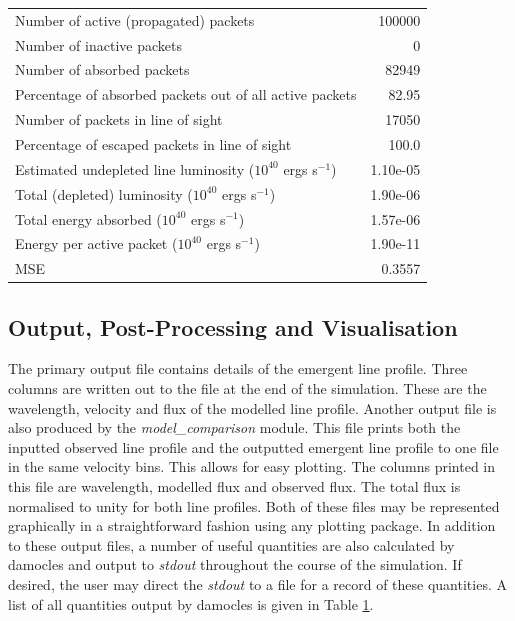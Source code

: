 \begin{table}
\begin{center}
\begin{tabular}{ l  r}
 Number of active (propagated) packets      &          100000\\
 Number of inactive packets        &            0\\
 Number of absorbed packets      &          82949   \\
 Percentage of absorbed packets out of all active packets & 82.95 \\
 Number of packets in line of sight  & 17050       \\
 Percentage of escaped packets in line of sight & 100.0 \\
 \midrule
 Estimated undepleted line luminosity ($10^{40}$ ergs s$^{-1}$)  & 1.10e-05\\
 Total (depleted) luminosity ($10^{40}$ ergs s$^{-1}$) & 1.90e-06\\
 Total energy absorbed ($10^{40}$ ergs s$^{-1}$) &  1.57e-06\\
 Energy per active packet ($10^{40}$ ergs s$^{-1}$) & 1.90e-11\\
 \midrule
 MSE	& 0.3557  \\
 \bottomrule
 \end{tabular}
 \end{center}
 \label{tb:outputs}
\end{table}%

\subsection{Output, Post-Processing and Visualisation}

The primary output file contains details of the emergent line profile.  Three columns are written out to the file at the end of the simulation.  These are the wavelength, velocity and flux of the modelled line profile.  Another output file is also produced by the \textit{model\_comparison} module.  This file prints both the inputted observed line profile and the outputted emergent line profile to one file in the same velocity bins.  This allows for easy plotting.  The columns printed in  this file are wavelength, modelled flux and observed flux. The total flux is normalised to unity for both line profiles.  Both of these files may be represented graphically in a straightforward fashion using any plotting package.  In addition to these output files, a number of useful quantities are also calculated by {\sc damocles} and output to \textit{stdout} throughout the course of the simulation.  If desired, the user may direct the \textit{stdout} to a file for a record of these quantities.  A list of all quantities output by {\sc damocles} is given in Table \ref{tb:outputs}.

